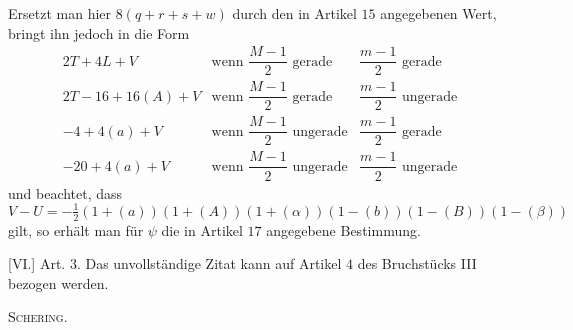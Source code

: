 Ersetzt man hier $8(q+r+s+w)$ durch den in Artikel $15$ angegebenen Wert, bringt ihn jedoch in die Form
\[
\begin{array}{lll}
2T+4L+V&\text{wenn }\dfrac{M-1}{2}\text{ gerade}&\dfrac{m-1}{2}\text{ gerade}\\[4pt]
2T-16+16(A)+V&\text{wenn }\dfrac{M-1}{2}\text{ gerade}&\dfrac{m-1}{2}\text{ ungerade}\\[4pt]
-4+4(a)+V&\text{wenn }\dfrac{M-1}{2}\text{ ungerade}&\dfrac{m-1}{2}\text{ gerade}\\[4pt]
-20+4(a)+V&\text{wenn }\dfrac{M-1}{2}\text{ ungerade}&\dfrac{m-1}{2}\text{ ungerade}
\end{array}
\]
und beachtet, dass
\[
V-U=-\tfrac12(1+(a))(1+(A))(1+(\alpha))(1-(b))(1-(B))(1-(\beta))
\]
gilt, so erhält man für $\psi$ die in Artikel $17$ angegebene Bestimmung.

[VI.] Art. $3$. Das unvollständige Zitat kann auf Artikel $4$ des Bruchstücks III bezogen werden.
\begin{flushright}\textsc{Schering.}\end{flushright}
